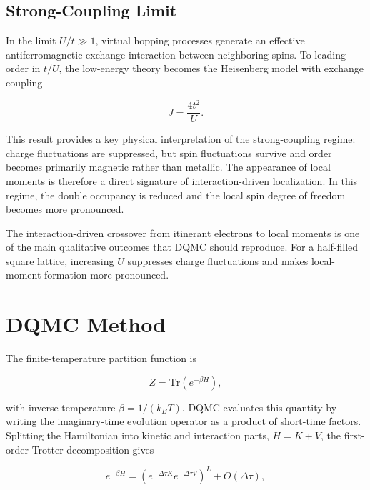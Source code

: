 \documentclass[9pt,a4paper,twocolumn,twoside]{rho-class/rho}
\begin{document}
\subsection{Strong-Coupling Limit}

In the limit $U/t \gg 1$, virtual hopping processes generate an effective antiferromagnetic exchange interaction between neighboring spins. To leading order in $t/U$, the low-energy theory becomes the Heisenberg model with exchange coupling

\begin{equation}
J = \frac{4t^2}{U}.
\end{equation}

This result provides a key physical interpretation of the strong-coupling regime: charge fluctuations are suppressed, but spin fluctuations survive and order becomes primarily magnetic rather than metallic. The appearance of local moments is therefore a direct signature of interaction-driven localization. In this regime, the double occupancy is reduced and the local spin degree of freedom becomes more pronounced.

The interaction-driven crossover from itinerant electrons to local moments is one of the main qualitative outcomes that DQMC should reproduce. For a half-filled square lattice, increasing $U$ suppresses charge fluctuations and makes local-moment formation more pronounced.

\section{DQMC Method}

The finite-temperature partition function is

\begin{equation}
Z = \mathrm{Tr}\left(e^{-\beta H}\right),
\end{equation}

with inverse temperature $\beta = 1/(k_B T)$. DQMC evaluates this quantity by writing the imaginary-time evolution operator as a product of short-time factors. Splitting the Hamiltonian into kinetic and interaction parts, $H=K+V$, the first-order Trotter decomposition gives

\begin{equation}
e^{-\beta H}
=
\left(e^{-\Delta\tau K}e^{-\Delta\tau V}\right)^L
+ O(\Delta\tau),
\end{equation}
\end{document}
